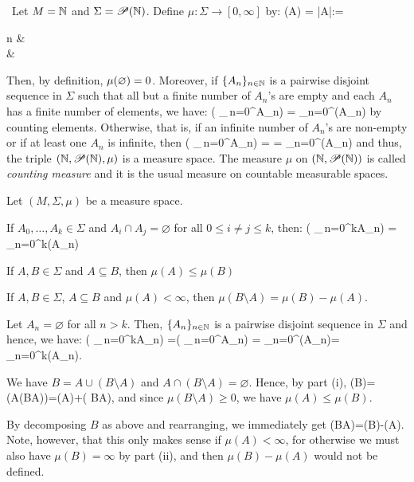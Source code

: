\be \
Let $M=\mathbb{N}$ and $\Sigma=\mathscr{P}(\mathbb{N})$. Define $\mu : \Sigma \to [0,\infty]$ by:
\bse
\mu(A) = |A|:=
\begin{cases}
n & \\
\infty & 
\end{cases}
\ese
Then, by definition, $\mu(\varnothing) =0$. Moreover, if $\{A_n\}_{n\in\mathbb{N}}$ is a pairwise disjoint sequence in $\Sigma$ such that all but a finite number of $A_n$'s are empty and each $A_n$ has a finite number of elements, we have:
\bse
\mu \biggl( \bigcup_{\,n=0}^{\infty}A_n\biggr) = \sum_{n=0}^{\infty}\mu(A_n)
\ese
by counting elements. Otherwise, that is, if an infinite number of $A_n$'s are non-empty or if at least one $A_n$ is infinite, then
\bse
\mu \biggl( \bigcup_{\,n=0}^{\infty}A_n\biggr) = \infty = \sum_{n=0}^{\infty}\mu(A_n)
\ese
and thus, the triple $(\mathbb{N},\mathscr{P}(\mathbb{N}),\mu)$ is a measure space. The measure $\mu$ on $(\mathbb{N},\mathscr{P}(\mathbb{N}))$ is called \emph{counting measure} and it is the usual measure on countable measurable spaces.
\ee

\pagebreak

\bp
Let $(M,\Sigma,\mu)$ be a measure space.
\ben[label=(\roman*)]
\item If $A_0,\ldots,A_k \in \Sigma$ and $A_i \cap A_j = \varnothing$ for all $0\leq i\neq j\leq k$, then:
\bse
\mu \biggl( \bigcup_{\,n=0}^{k}A_n\biggr) = \sum_{n=0}^{k}\mu(A_n)
\ese
\item If $A,B\in \Sigma$ and $A \subseteq B$, then $\mu(A) \leq \mu(B)$
\item If $A,B \in \Sigma$, $A \subseteq B$ and $\mu(A)<\infty$, then $ \mu(B\setminus A)=\mu(B)-\mu(A)$.
\een
\ep

\bq
\ben[label=(\roman*)]
\item Let $A_n=\varnothing$ for all $n>k$. Then, $\{A_n\}_{n\in\mathbb{N}}$ is a pairwise disjoint sequence in $\Sigma$ and hence, we have:
\bse
\mu \biggl( \bigcup_{\,n=0}^{k}A_n\biggr) =\mu \biggl( \bigcup_{\,n=0}^{\infty}A_n\biggr) = \sum_{n=0}^{\infty}\mu(A_n)= \sum_{n=0}^{k}\mu(A_n).
\ese
\item We have $B=A\cup (B\setminus A)$ and $A\cap (B\setminus A)=\varnothing$. Hence, by part (i),
\bse
\mu(B)= \mu(A\cup (B\setminus A))=\mu(A)+\mu ( B\setminus A),
\ese
and since $\mu ( B\setminus A)\geq 0$, we have $ \mu(A) \leq \mu(B)$.
\item By decomposing $B$ as above and rearranging, we immediately get
\bse
\mu(B\setminus A)=\mu(B)-\mu(A).
\ese
Note, however, that this only makes sense if $\mu(A)<\infty$, for otherwise we must also have $\mu(B)=\infty$ by part (ii), and then $\mu(B)-\mu(A)$ would not be defined.
\qedhere
\een 
\eq


